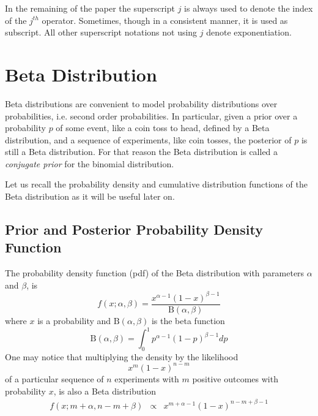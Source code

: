 \documentclass[runningheads]{llncs}
\begin{document}
\begin{remark}
In the remaining of the paper the superscript $j$ is always used to
denote the index of the $j^{th}$ operator. Sometimes, though in a
consistent manner, it is used as subscript. All other superscript
notations not using $j$ denote exponentiation.
\end{remark}

\section{Beta Distribution}
\label{beta}

Beta distributions \cite{Abourizk94Fitting} are convenient to model
probability distributions over probabilities, i.e. second order
probabilities. In particular, given a prior over a probability $p$ of
some event, like a coin toss to head, defined by a Beta distribution,
and a sequence of experiments, like coin tosses, the posterior of $p$
is still a Beta distribution. For that reason the Beta distribution is
called a \emph{conjugate prior} for the binomial distribution.

Let us recall the probability density and cumulative distribution
functions of the Beta distribution as it will be useful later on.
\subsection{Prior and Posterior Probability Density Function}
The probability density function (pdf) of the Beta distribution with
parameters $\alpha$ and $\beta$, is
\begin{equation}
  \label{beta-pdf}
f(x; \alpha, \beta) = \frac{x^{\alpha - 1} (1-x)^{\beta - 1}}
                           {\mathrm{B}(\alpha, \beta)}
\end{equation}
where $x$ is a probability and $\mathrm{B}(\alpha, \beta)$ is the beta
function
\begin{equation}
\mathrm{B}(\alpha, \beta) = \int_0^1 p^{\alpha - 1}(1-p)^{\beta - 1}
dp
\end{equation}
One may notice that multiplying the density by the likelihood
\begin{equation}
x^m (1-x)^{n-m}
\end{equation}
of a particular sequence of $n$ experiments with $m$ positive outcomes
with probability $x$, is also a Beta distribution
\begin{eqnarray}
  f(x; m+\alpha, n-m+\beta) & \propto & x^{m+\alpha - 1}
                                        (1-x)^{n-m+\beta - 1}
\end{eqnarray}
\end{document}
